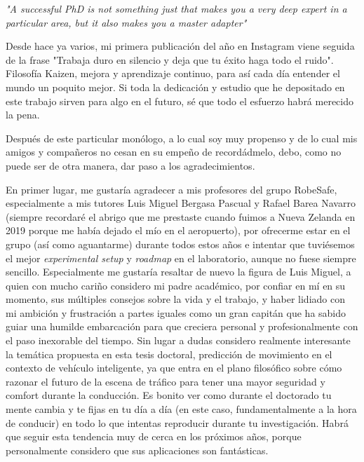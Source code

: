 \begin{center}
	\textit{"A successful PhD is not something just that makes you a very deep expert in a particular area, but it also makes you a master adapter"}
\end{center}

Desde hace ya varios, mi primera publicación del año en Instagram viene seguida de la frase "Trabaja duro en silencio y deja que tu éxito haga todo el ruido". Filosofía Kaizen, mejora y aprendizaje continuo, para así cada día entender el mundo un poquito mejor. Si toda la dedicación y estudio que he depositado en este trabajo sirven para algo en el futuro, sé que todo el esfuerzo habrá merecido la pena.

Después de este particular monólogo, a lo cual soy muy propenso y de lo cual mis amigos y compañeros no cesan en su empeño de recordádmelo, debo, como no puede ser de otra manera, dar paso a los agradecimientos.

En primer lugar, me gustaría agradecer a mis profesores del grupo RobeSafe, especialmente a mis tutores Luis Miguel Bergasa Pascual y Rafael Barea Navarro (siempre recordaré el abrigo que me prestaste cuando fuimos a Nueva Zelanda en 2019 porque me había dejado el mío en el aeropuerto), por ofrecerme estar en el grupo (así como aguantarme) durante todos estos años e intentar que tuviésemos el mejor \textit{experimental setup} y \textit{roadmap} en el laboratorio, aunque no fuese siempre sencillo. Especialmente me gustaría resaltar de nuevo la figura de Luis Miguel, a quien con mucho cariño considero mi padre académico, por confiar en mí en su momento, sus múltiples consejos sobre la vida y el trabajo, y haber lidiado con mi ambición y frustración a partes iguales como un gran capitán que ha sabido guiar una humilde embarcación para que creciera personal y profesionalmente con el paso inexorable del tiempo. Sin lugar a dudas considero realmente interesante la temática propuesta en esta tesis doctoral, predicción de movimiento en el contexto de vehículo inteligente, ya que entra en el plano filosófico sobre cómo razonar el futuro de la escena de tráfico para tener una mayor seguridad y comfort durante la conducción. Es bonito ver como durante el doctorado tu mente cambia y te fijas en tu día a día (en este caso, fundamentalmente a la hora de conducir) en todo lo que intentas reproducir durante tu investigación. Habrá que seguir esta tendencia muy de cerca en los próximos años, porque personalmente considero que sus aplicaciones son fantásticas.

